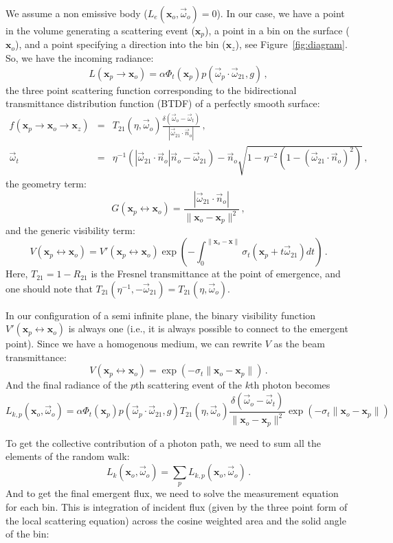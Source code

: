 \documentclass[10pt,a4paper]{article}
\newcommand{\x}{\mathbf{x}}
\newcommand{\y}{\mathbf{x}_o}
\newcommand{\z}{\mathbf{x}_z}
\newcommand{\vomega}{\vec{\omega}}
\begin{document}
We assume a non emissive body ($L_e(\x_o, \vomega_o) = 0$). In our case, we have a point in the volume generating a scattering event ($\x_p$), a point in a bin on the surface ($\y$), and a point specifying a direction into the bin ($\z$), see Figure~\ref{fig:diagram}. So, we have the incoming radiance:
%
\[
L(\x_p \rightarrow \y) = \alpha \Phi_t(\mathbf{x}_p) p(\vomega_p \cdot \vomega_{21}, g) \, ,
\]
%
the three point scattering function corresponding to the bidirectional transmittance distribution function (BTDF) of a perfectly smooth surface:
%
\begin{eqnarray*}
f(\x_p \rightarrow \y \rightarrow \z) & = & T_{21}(\eta, \vomega_o) \frac{\delta(\vomega_o - \vomega_t)}{|\vomega_{21}\cdot\vec{n}_o|} \, , \\
\vomega_t & = & \eta^{-1}(|\vomega_{21}\cdot\vec{n}_o|\vec{n}_o - \vomega_{21}) - \vec{n}_o \sqrt{1 - \eta^{-2}(1 - (\vomega_{21}\cdot\vec{n}_o)^2)} \, ,
\end{eqnarray*}
%
the geometry term:
%
\[
G(\x_p \leftrightarrow \y) = \frac{|\vomega_{21}\cdot\vec{n}_o |}{\|\y - \x_p\|^2} \, ,
\]
%
and the generic visibility term:
%
\[
V(\x_p \leftrightarrow \y) = V'(\x_p \leftrightarrow \y) \exp\left(-\int_0^{\|\y - \x\|} \sigma_t\left(\x_p + t \vomega_{21}\right) dt\right) \, .
\]
%
Here, $T_{21} = 1 - R_{21}$ is the Fresnel transmittance at the point of emergence, and one should note that $T_{21}(\eta^{-1}, -\vomega_{21}) = T_{21}(\eta, \vomega_o)$.

In our configuration of a semi infinite plane, the binary visibility function $V'(\x_p \leftrightarrow \y)$ is always one (i.e., it is always possible to connect to the emergent point). Since we have a homogenous medium, we can rewrite $V$ as the beam transmittance:
%
\[
V(\x_p \leftrightarrow \y) = \exp(-\sigma_t \|\y - \x_p\|) \, .
\]
%
And the final radiance of the $p$th scattering event of the $k$th photon becomes
%
\[
L_{k,p}(\x_o, \vomega_o) = \alpha \Phi_t(\mathbf{x}_p) p(\vomega_p \cdot \vomega_{21}, g)  T_{21}(\eta, \vomega_o) \frac{\delta(\vomega_o - \vomega_t)}{\|\y - \x_p\|^2} \exp(-\sigma_t \|\y - \x_p\|)
\]

To get the collective contribution of a photon path, we need to sum all the elements of the random walk:
%
\[
L_k(\x_o, \vomega_o) = \sum_p L_{k,p}(\x_o, \vomega_o) \, .
\]
%
And to get the final emergent flux, we need to solve the measurement equation for each bin. This is integration of incident flux (given by the three point form of the local scattering equation) across the cosine weighted area and the solid angle of the bin:
\end{document}
